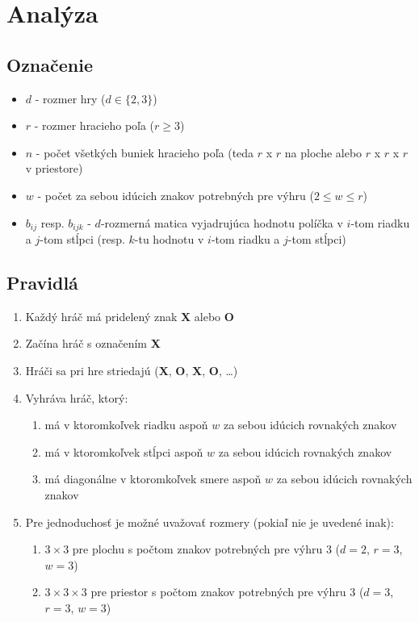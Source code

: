\section{Analýza}\label{sec:analysis}

\subsection{Označenie}\label{subsec:label}

\begin{itemize}
    \item $d$ - rozmer hry ($d \in \{2,3\}$)
    \item $r$ - rozmer hracieho poľa ($r \geq 3$)
    \item $n$ - počet všetkých buniek hracieho poľa (teda $r$ x $r$ na ploche alebo $r$ x $r$ x $r$ v priestore)
    \item $w$ - počet za sebou idúcich znakov potrebných pre výhru ($2 \leq w \leq r$)
    \item $b_{ij}$ resp. $b_{ijk}$ - $d$-rozmerná matica vyjadrujúca hodnotu políčka v $i$-tom riadku a $j$-tom
    stĺpci (resp. $k$-tu hodnotu v $i$-tom riadku a $j$-tom stĺpci)
\end{itemize}

\subsection{Pravidlá}\label{subsec:rules}

\begin{enumerate}
    \item Každý hráč má pridelený znak \textbf{X} alebo \textbf{O}
    \item Začína hráč s označením \textbf{X}
    \item Hráči sa pri hre striedajú (\textbf{X}, \textbf{O}, \textbf{X}, \textbf{O}, \ldots)
    \item Vyhráva hráč, ktorý:
    \begin{enumerate}
        \item má v ktoromkoľvek riadku aspoň $w$ za sebou idúcich rovnakých znakov
        \item má v ktoromkoľvek stĺpci aspoň $w$ za sebou idúcich rovnakých znakov
        \item má diagonálne v ktoromkoľvek smere aspoň $w$ za sebou idúcich rovnakých znakov
    \end{enumerate}
    \item Pre jednoduchosť je možné uvažovať rozmery (pokiaľ nie je uvedené inak):
    \begin{enumerate}
        \item $3 \times 3$ pre plochu s počtom znakov potrebných pre výhru 3 ($d = 2$, $r = 3$, $w = 3$)
        \item $3 \times 3 \times 3$ pre priestor s počtom znakov potrebných pre výhru 3 ($d = 3$, $r = 3$, $w = 3$)
    \end{enumerate}
\end{enumerate}

